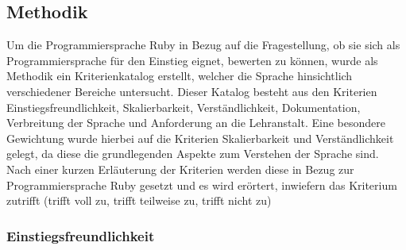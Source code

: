 \documentclass[12pt,DIV=14, version=first, BCOR=10mm,a4paper,twoside,parskip=half-,headsepline,headinclude]{scrartcl}
\begin{document}
\subsection{Methodik}
\begin{flushleft}
Um die Programmiersprache Ruby in Bezug auf die Fragestellung, ob sie sich als Programmiersprache für den Einstieg eignet, bewerten zu können, wurde als Methodik ein Kriterienkatalog erstellt, welcher die Sprache hinsichtlich verschiedener Bereiche untersucht. Dieser Katalog besteht aus den Kriterien Einstiegsfreundlichkeit, Skalierbarkeit, Verständlichkeit, Dokumentation, Verbreitung der Sprache und Anforderung an die Lehranstalt. Eine besondere Gewichtung wurde hierbei auf die Kriterien Skalierbarkeit und Verständlichkeit gelegt, da diese die grundlegenden Aspekte zum Verstehen der Sprache sind. Nach einer kurzen Erläuterung der Kriterien werden diese in Bezug zur Programmiersprache Ruby gesetzt und es wird erörtert, inwiefern das Kriterium zutrifft (trifft voll zu, trifft teilweise zu, trifft nicht zu)
\end{flushleft}

\subsubsection{Einstiegsfreundlichkeit}
\end{document}
